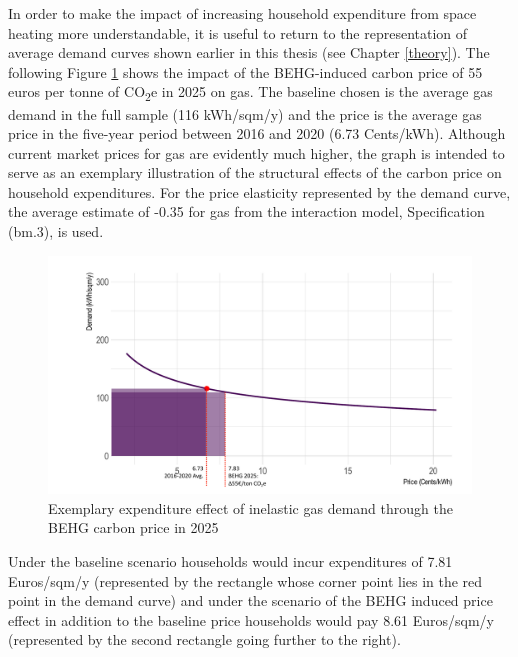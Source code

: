 \documentclass[12pt,twoside]{reedthesis}
\begin{document}
In order to make the impact of increasing household expenditure from space heating more understandable, it is useful to return to the representation of average demand curves shown earlier in this thesis (see Chapter \ref{theory}). The following Figure \ref{fig:budget-effect} shows the impact of the BEHG-induced carbon price of 55 euros per tonne of CO\textsubscript{2}e in 2025 on gas. The baseline chosen is the average gas demand in the full sample (116 kWh/sqm/y) and the price is the average gas price in the five-year period between 2016 and 2020 (6.73 Cents/kWh). Although current market prices for gas are evidently much higher, the graph is intended to serve as an exemplary illustration of the structural effects of the carbon price on household expenditures. For the price elasticity represented by the demand curve, the average estimate of -0.35 for gas from the interaction model, Specification (bm.3), is used.
\begin{figure}

{\centering \includegraphics[width=1\linewidth]{figure/budget_effect_gas_example} 

}

\caption{Exemplary expenditure effect of inelastic gas demand through the BEHG carbon price in 2025}\label{fig:budget-effect}
\end{figure}
Under the baseline scenario households would incur expenditures of 7.81 Euros/sqm/y (represented by the rectangle whose corner point lies in the red point in the demand curve) and under the scenario of the BEHG induced price effect in addition to the baseline price households would pay 8.61 Euros/sqm/y (represented by the second rectangle going further to the right).
\end{document}
